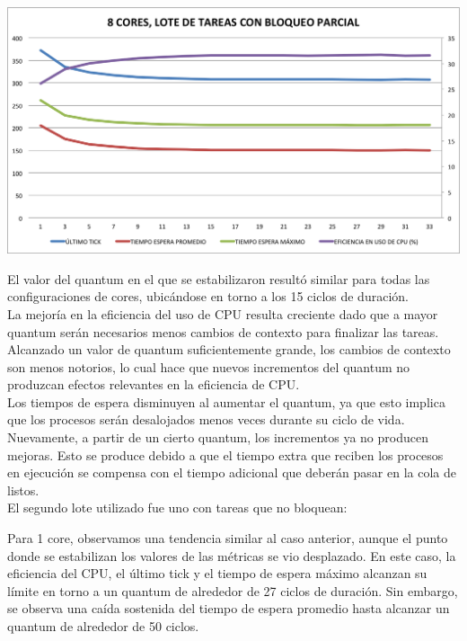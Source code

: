 \begin{center}
	\includegraphics[scale=0.4]{graficos/8cores_loteNormal.png}
\end{center}

El valor del quantum en el que se estabilizaron result\'o similar para todas las configuraciones de cores, ubic\'andose en torno a los 15 ciclos de duraci\'on. \\ 

La mejor\'ia en la eficiencia del uso de CPU resulta creciente dado que a mayor quantum ser\'an necesarios menos cambios de contexto para finalizar las tareas. Alcanzado un valor de quantum suficientemente grande, los cambios de contexto son menos notorios, lo cual hace que nuevos incrementos del quantum no produzcan efectos relevantes en la eficiencia de CPU.\\
Los tiempos de espera disminuyen al aumentar el quantum, ya que esto implica que los procesos ser\'an desalojados menos veces durante su ciclo de vida. Nuevamente, a partir de un cierto quantum, los incrementos ya no producen mejoras. Esto se produce debido a que el tiempo extra que reciben los procesos en ejecuci\'on se compensa con el tiempo adicional que deber\'an pasar en la cola de listos. \\

El segundo lote utilizado fue uno con tareas que no bloquean:


Para 1 core, observamos una tendencia similar al caso anterior, aunque el punto donde se estabilizan los valores de las m\'etricas se vio desplazado. En este caso, la eficiencia del CPU, el \'ultimo tick y el tiempo de espera m\'aximo alcanzan su l\'imite en torno a un quantum de alrededor de 27 ciclos de duraci\'on. Sin embargo, se observa una ca\'ida sostenida del tiempo de espera promedio hasta alcanzar un quantum de alrededor de 50 ciclos.


